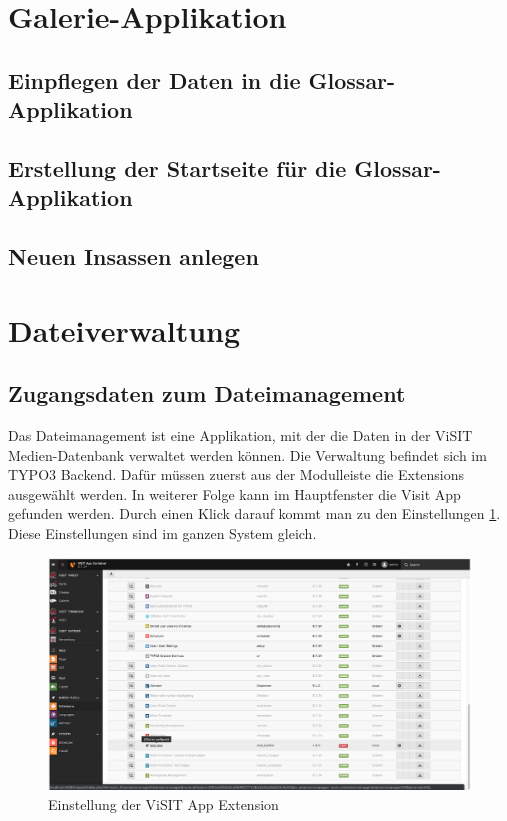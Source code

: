 \section{Galerie-Applikation}

\subsection{Einpflegen der Daten in die Glossar-Applikation}

\subsection{Erstellung der Startseite für die Glossar-Applikation}

\subsection{Neuen Insassen anlegen}






\section{Dateiverwaltung}

\subsection{Zugangsdaten zum Dateimanagement}
Das Dateimanagement ist eine Applikation, mit der die Daten in der ViSIT Medien-Datenbank verwaltet werden können. Die Verwaltung befindet sich im TYPO3 Backend. Dafür müssen zuerst aus der Modulleiste die Extensions ausgewählt werden. In weiterer Folge kann im Hauptfenster die Visit App gefunden werden. Durch einen Klick darauf kommt man zu den Einstellungen \ref{img:einstellung_extension}. Diese Einstellungen sind im ganzen System gleich.
\begin{figure}[ht!]
\centering
\includegraphics[width=12cm]{Figures/paula/dateiverwaltung/einstellung_extension.png}
\caption{Einstellung der ViSIT App Extension}
\label{img:einstellung_extension}
\end{figure}


\cite{anno4j1}